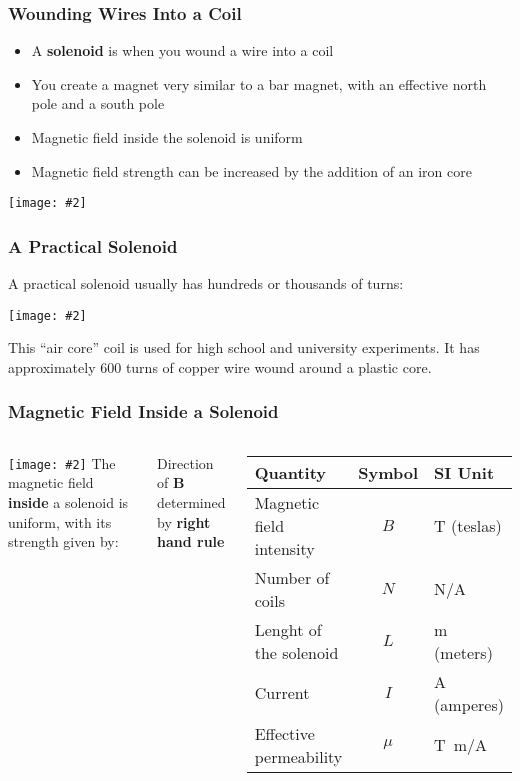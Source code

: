 \documentclass[12pt,aspectratio=169]{beamer}
\newcommand{\pic}[2]{\texttt{[image: \#2]}}
\newcommand{\mb}[1]{\mathbf{#1}}
\newcommand{\eq}[2]{\vspace{#1}{\Large\begin{displaymath}#2\end{displaymath}}}
\begin{document}
\begin{frame}
  \frametitle{Wounding Wires Into a Coil}
  \begin{itemize}
  \item A \textbf{solenoid} is when you wound a wire into a coil
  \item You create a magnet very similar to a bar magnet, with an effective
    north pole and a south pole
  \item Magnetic field inside the solenoid is uniform
  \item Magnetic field strength can be increased by the addition of an iron core
  \end{itemize}
  \begin{center}
    \pic{.5}{barsol.png}
  \end{center}
\end{frame}

\begin{frame}
  \frametitle{A Practical Solenoid}
  A practical solenoid usually has hundreds or thousands of turns:

  \vspace{-.2in}
  \begin{center}
    \pic{.45}{1020201515330450255.jpg}
  \end{center}

  \vspace{-.2in}
  This ``air core'' coil is used for high school and university experiments. It
  has approximately 600 turns of copper wire wound around a plastic core.
\end{frame}

\begin{frame}
  \frametitle{Magnetic Field Inside a Solenoid}
  \begin{columns}
    \pic{1.1}{magneticfield4.png}
    The magnetic field \textbf{inside} a solenoid is uniform, with its strength
    given by:
    
    \eq{-.2in}{
      \boxed{B=\frac{\mu NI}{L}}
    }
    Direction of $\mb{B}$ determined by \textbf{right hand rule}
      \vspace{-.1in}
      \begin{center}
        \begin{tabular}{l|c|l}
          \rowcolor{pink}
          \textbf{Quantity} & \textbf{Symbol} & \textbf{SI Unit} \\ \hline
          Magnetic field intensity & $B$ & \si{T} (teslas)\\
          Number of coils          & $N$ & N/A\\
          Lenght of the solenoid   & $L$ & \si{m} (meters)\\
          Current                  & $I$ & \si{A} (amperes)\\
          Effective permeability & $\mu$ & \si{T.m/A}\\
        \end{tabular}
      \end{center}
  \end{columns}
\end{frame}
\end{document}

